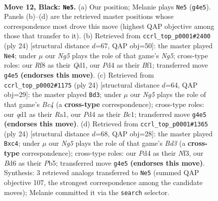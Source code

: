 \documentclass[11pt]{article}
\begin{document}
\clearpage

\begin{figure}[p]\centering
\begin{subfigure}{0.46\textwidth}\centering
\resizebox{\linewidth}{!}{%
\newchessgame
\chessboard[
  setfen={r1bq1rk1/pp3ppp/3b4/1B1p4/3p2n1/3P3P/PPP1NPP1/R1BQR1K1 b - - 0 12},
  showmover=false,
  pgfstyle=straightmove, color=movearrow, markmove={g4-e5}
]}
\caption{}
\end{subfigure}\hfill
\begin{subfigure}{0.46\textwidth}\centering
\resizebox{\linewidth}{!}{%
\newchessgame
\chessboard[
  setfen={rn2k2r/1pqbbpp1/p2p3p/3Pp1N1/P7/R3B3/1PP2PPP/3QKB1R w Kkq - 0 13},
  showmover=false,
  pgfstyle=straightmove, color=movearrow, markmove={g5-e4}
]}
\caption{}
\end{subfigure}
\\[4pt]
\begin{subfigure}{0.46\textwidth}\centering
\resizebox{\linewidth}{!}{%
\newchessgame
\chessboard[
  setfen={rn2k2r/1pq1bpp1/p2p3p/3Ppb2/P1B5/8/1PPN1PPP/R1BQ1RK1 w kq - 1 13},
  showmover=false,
  pgfstyle=straightmove, color=movearrow, markmove={c4-d3}
]}
\caption{}
\end{subfigure}\hfill
\begin{subfigure}{0.46\textwidth}\centering
\resizebox{\linewidth}{!}{%
\newchessgame
\chessboard[
  setfen={r1bq1rk1/pp3ppp/3bpn2/1P6/2p5/3BPN2/P4PPP/R1BQ1RK1 w - - 0 13},
  showmover=false,
  pgfstyle=straightmove, color=movearrow, markmove={d3-c4}
]}
\caption{}
\end{subfigure}
\caption{\textbf{Move 12, Black: \texttt{Ne5}.} (a) Our position; Melanie plays \texttt{Ne5} (\texttt{g4e5}). Panels (b)--(d) are the retrieved master positions whose correspondence most drove this move (highest QAP objective among those that transfer to it). (b) Retrieved from \texttt{ccrl\_top\_p0001\#2400} (ply 24) [structural distance $d$=67, QAP obj=50]: the master played \texttt{Ne4}; under $\mu$ our \emph{Ng5} plays the role of that game's \emph{Ng5}; cross-type roles: our \emph{R}f8 as their \emph{Q}d1, our \emph{P}d4 as their \emph{B}f1; transferred move \texttt{g4e5} \textbf{(endorses this move)}. (c) Retrieved from \texttt{ccrl\_top\_p0002\#1175} (ply 24) [structural distance $d$=64, QAP obj=29]: the master played \texttt{Bd3}; under $\mu$ our \emph{Ng5} plays the role of that game's \emph{Bc4} (a \textbf{cross-type} correspondence); cross-type roles: our \emph{q}d1 as their \emph{R}a1, our \emph{P}d4 as their \emph{B}c1; transferred move \texttt{g4e5} \textbf{(endorses this move)}. (d) Retrieved from \texttt{ccrl\_top\_p0001\#1365} (ply 24) [structural distance $d$=68, QAP obj=28]: the master played \texttt{Bxc4}; under $\mu$ our \emph{Ng5} plays the role of that game's \emph{Bd3} (a \textbf{cross-type} correspondence); cross-type roles: our \emph{P}d4 as their \emph{N}f3, our \emph{B}d6 as their \emph{P}b5; transferred move \texttt{g4e5} \textbf{(endorses this move)}. Synthesis: 3 retrieved analogs transferred to \texttt{Ne5} (summed QAP objective 107, the strongest correspondence among the candidate moves); Melanie committed it via the \texttt{search} selector.}
\label{fig:thought-m23}
\end{figure}
\end{document}
